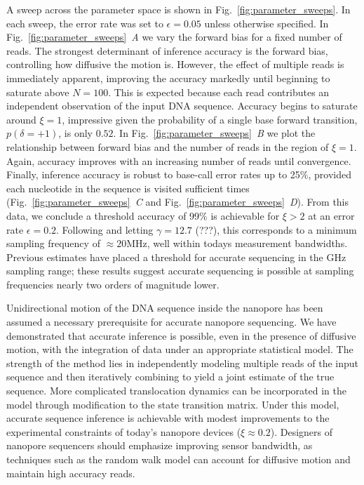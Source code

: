 \documentclass{biophys_letter}
\newcommand{\mhz}{\si{\mega\hertz}}
\newcommand{\kje}[1]{\textcolor{BurntOrange}{#1}}
\begin{document}
\begingroup
\setlength{\thickmuskip}{5mu}
A sweep across the parameter space is shown in Fig.~\ref{fig:parameter_sweeps}.
In each sweep, the error rate was set to $\epsilon=0.05$ unless otherwise specified.
In Fig.~\ref{fig:parameter_sweeps}\emph{~A} we vary the forward bias for a fixed number of reads.
The strongest determinant of inference accuracy is the forward bias, controlling how diffusive the motion is.
However, the effect of multiple reads is immediately apparent, improving the accuracy markedly until beginning to saturate above $N=100$.
This is expected because each read contributes an independent observation of the input DNA sequence.
Accuracy begins to saturate around $\xi=1$, impressive given the probability of a single base forward transition, $p(\delta=+1)$, is only $0.52$.
In Fig.~\ref{fig:parameter_sweeps}\emph{~B} we plot the relationship between forward bias and the number of reads in the region of $\xi=1$.
Again, accuracy improves with an increasing number of reads until convergence.
Finally, inference accuracy is \kje{robust to base-call error rates up to 25\%}, provided each nucleotide in the sequence is visited sufficient times (Fig.~\ref{fig:parameter_sweeps}\emph{~C} and Fig.~\ref{fig:parameter_sweeps}\emph{~D}).
\kje{From this data, we conclude a threshold accuracy of 99\% is achievable for $\xi>2$ at an error rate $\epsilon=0.2$.
Following \cite{Larkin:2013} and letting $\gamma=12.7$ (???), this corresponds to a minimum sampling frequency of $\approx20\mhz$, well within todays measurement bandwidths.
Previous estimates have placed a threshold for accurate sequencing in the GHz sampling range; these results suggest accurate sequencing is possible at sampling frequencies nearly two orders of magnitude lower.}
\endgroup

Unidirectional motion of the DNA sequence inside the nanopore has been assumed a necessary prerequisite for accurate nanopore sequencing.
We have demonstrated that accurate inference is possible, even in the presence of diffusive motion, with the integration of data under an appropriate statistical model.
The strength of the method lies in independently modeling multiple reads of the input sequence and then iteratively combining to yield a joint estimate of the true sequence.
More complicated translocation dynamics can be incorporated in the model through modification to the state transition matrix.
\kje{Under this model, accurate sequence inference is achievable with modest improvements to the experimental constraints of today's nanopore devices ($\xi\approx 0.2$).
Designers of nanopore sequencers should emphasize improving sensor bandwidth, as techniques such as the random walk model can account for diffusive motion and maintain high accuracy reads.}
\end{document}
